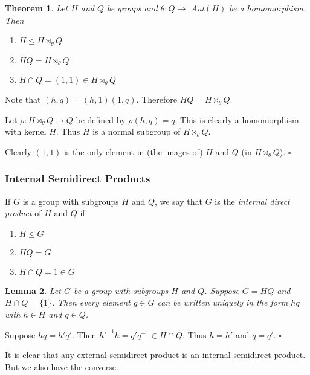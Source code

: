 \documentclass[10pt]{article}
\newtheorem{theorem}{Theorem}[section]
\newtheorem{lemma}[theorem]{Lemma}
\newenvironment{proof}[1][Proof]{\begin{trivlist}
\item[\hskip \labelsep {\itshape #1}]}{\end{trivlist}}
\newenvironment{definition}[1][Definition]{\begin{trivlist}
\item[\hskip \labelsep {\bfseries #1}]}{\end{trivlist}}
\begin{document}
\begin{theorem}
Let $H$ and $Q$ be groups and $\theta : Q \to$ Aut$(H)$ be a homomorphism. Then
\begin{enumerate}
\item $H \mathrel{\unlhd} H\rtimes_{\theta} Q$
\item $HQ = H\rtimes_{\theta} Q$
\item $H\cap Q = (1, 1) \in H\rtimes_{\theta} Q$
\end{enumerate}
\end{theorem}

\begin{proof}
Note that $(h, q) = (h, 1)(1, q)$. Therefore $HQ = H\rtimes_{\theta} Q$.

Let $\rho : H\rtimes_{\theta} Q \to Q$ be defined by $\rho(h, q) = q$. This is clearly a homomorphism with kernel $H$. Thus $H$ is a normal subgroup of $H\rtimes_{\theta} Q$.

Clearly $(1, 1)$ is the only element in (the images of) $H$ and $Q$ (in $H\rtimes_{\theta} Q$). $\square$
\end{proof}

\subsubsection{Internal Semidirect Products}

\begin{definition}
If $G$ is a group with subgroups $H$ and $Q$, we say that $G$ is the \emph{internal direct product} of $H$ and $Q$ if
\begin{enumerate}
\item $H \mathrel{\unlhd} G$
\item $HQ = G$
\item $H\cap Q = 1 \in G$
\end{enumerate}
\end{definition}

\begin{lemma}
Let $G$ be a group with subgroups $H$ and $Q$. Suppose $G = HQ$ and $H\cap Q = \{1\}$. Then every element $g \in G$ can be written uniquely in the form $hq$ with $h \in H$ and $q \in Q$.
\end{lemma}

\begin{proof}
Suppose $hq = h'q'$. Then $h'^{-1}h = q'q^{-1} \in H\cap Q$. Thus $h = h'$ and $q = q'$. $\square$
\end{proof}

It is clear that any external semidirect product is an internal semidirect product. But we also have the converse.
\end{document}
